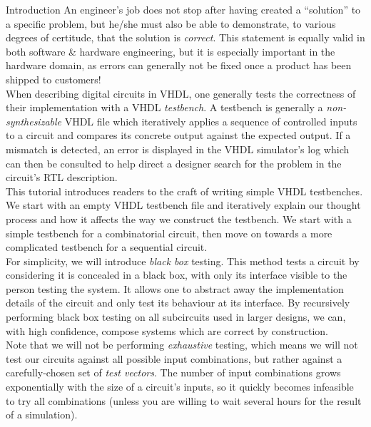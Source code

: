 \documentclass[lab]{course}
\begin{document}
\begin{section}{Introduction}
    An engineer's job does not stop after having created a ``solution'' to a specific problem, but he/she must also be able to demonstrate, to various degrees of certitude, that the solution is \emph{correct}. This statement is equally valid in both software \& hardware engineering, but it is especially important in the hardware domain, as errors can generally not be fixed once a product has been shipped to customers! \\

    When describing digital circuits in VHDL, one generally tests the correctness of their implementation with a VHDL \emph{testbench}. A testbench is generally a \emph{non-synthesizable} VHDL file which iteratively applies a sequence of controlled inputs to a circuit and compares its concrete output against the expected output. If a mismatch is detected, an error is displayed in the VHDL simulator's log which can then be consulted to help direct a designer search for the problem in the circuit's RTL description. \\

    This tutorial introduces readers to the craft of writing simple VHDL testbenches. We start with an empty VHDL testbench file and iteratively explain our thought process and how it affects the way we construct the testbench. We start with a simple testbench for a combinatorial circuit, then move on towards a more complicated testbench for a sequential circuit. \\

    For simplicity, we will introduce \emph{black box} testing. This method tests a circuit by considering it is concealed in a black box, with only its interface visible to the person testing the system. It allows one to abstract away the implementation details of the circuit and only test its behaviour at its interface. By recursively performing black box testing on all subcircuits used in larger designs, we can, with high confidence, compose systems which are correct by construction. \\

    Note that we will not be performing \emph{exhaustive} testing, which means we will not test our circuits against all possible input combinations, but rather against a carefully-chosen set of \emph{test vectors}. The number of input combinations grows exponentially with the size of a circuit's inputs, so it quickly becomes infeasible to try all combinations (unless you are willing to wait several hours for the result of a simulation).
\end{section}
\end{document}
